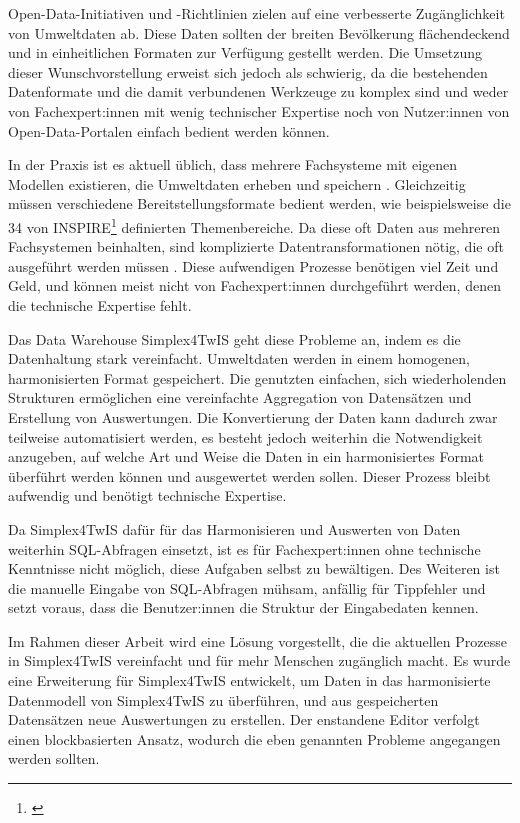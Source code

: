 Open-Data-Initiativen und -Richtlinien zielen auf eine verbesserte Zugänglichkeit von Umweltdaten ab. Diese Daten sollten der breiten Bevölkerung flächendeckend und in einheitlichen Formaten zur Verfügung gestellt werden. Die Umsetzung dieser Wunschvorstellung erweist sich jedoch als schwierig, da die bestehenden Datenformate und die damit verbundenen Werkzeuge zu komplex sind und weder von Fachexpert:innen mit wenig technischer Expertise noch von Nutzer:innen von Open-Data-Portalen einfach bedient werden können.

In der Praxis ist es aktuell üblich, dass mehrere Fachsysteme mit eigenen Modellen existieren, die Umweltdaten erheben und speichern \parencite{rudolfUnsereDaten2022}. Gleichzeitig müssen verschiedene Bereitstellungsformate bedient werden, wie beispielsweise die 34 von INSPIRE\footnote{\textcite{inspireRichtlinie20072007}} definierten Themenbereiche. Da diese oft Daten aus mehreren Fachsystemen beinhalten, sind komplizierte Datentransformationen nötig, die oft ausgeführt werden müssen \parencite{grossmannEnvVisioUniverselle2021}. Diese aufwendigen Prozesse benötigen viel Zeit und Geld, und können meist nicht von Fachexpert:innen durchgeführt werden, denen die technische Expertise fehlt.

\pskip
Das Data Warehouse Simplex4TwIS geht diese Probleme an, indem es die Datenhaltung stark vereinfacht. Umweltdaten werden in einem homogenen, harmonisierten Format gespeichert. Die genutzten einfachen, sich wiederholenden Strukturen ermöglichen eine vereinfachte Aggregation von Datensätzen und Erstellung von Auswertungen. Die Konvertierung der Daten kann dadurch zwar teilweise automatisiert werden, es besteht jedoch weiterhin die Notwendigkeit anzugeben, auf welche Art und Weise die Daten in ein harmonisiertes Format überführt werden können und ausgewertet werden sollen. Dieser Prozess bleibt aufwendig und benötigt technische Expertise.

Da Simplex4TwIS dafür für das Harmonisieren und Auswerten von Daten weiterhin \acs{SQL}-Abfragen einsetzt, ist es für Fachexpert:innen ohne technische Kenntnisse nicht möglich, diese Aufgaben selbst zu bewältigen. Des Weiteren ist die manuelle Eingabe von \acs{SQL}-Abfragen mühsam, anfällig für Tippfehler und setzt voraus, dass die Benutzer:innen die Struktur der Eingabedaten kennen.

\pskip
Im Rahmen dieser Arbeit wird eine Lösung vorgestellt, die die aktuellen Prozesse in Simplex4TwIS vereinfacht und für mehr Menschen zugänglich macht. Es wurde eine Erweiterung für Simplex4TwIS entwickelt, um Daten in das harmonisierte Datenmodell von Simplex4TwIS zu überführen, und aus gespeicherten Datensätzen neue Auswertungen zu erstellen. Der enstandene Editor verfolgt einen blockbasierten Ansatz, wodurch die eben genannten Probleme angegangen werden sollten.


